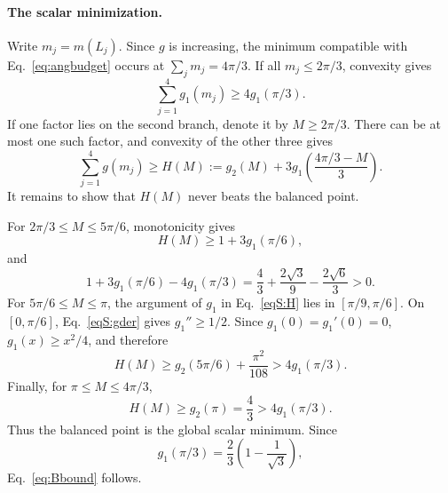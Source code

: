 \documentclass[aps,prl,reprint,superscriptaddress,nofootinbib]{revtex4-2}
\begin{document}
\paragraph{The scalar minimization.}
Write $m_j=m(L_j)$. Since $g$ is increasing, the minimum compatible with Eq.~\eqref{eq:angbudget} occurs at $\sum_jm_j=4\pi/3$. If all $m_j\leq2\pi/3$, convexity gives
\begin{equation}
\sum_{j=1}^{4}g_1(m_j)\geq4g_1(\pi/3).
\label{eqS:jensen}
\end{equation}
If one factor lies on the second branch, denote it by $M\geq2\pi/3$. There can be at most one such factor, and convexity of the other three gives
\begin{equation}
\sum_{j=1}^{4}g(m_j)\geq
H(M):=g_2(M)+3g_1\!\left(\frac{4\pi/3-M}{3}\right).
\label{eqS:H}
\end{equation}
It remains to show that $H(M)$ never beats the balanced point.

For $2\pi/3\leq M\leq5\pi/6$, monotonicity gives
\begin{equation}
H(M)\geq1+3g_1(\pi/6),
\end{equation}
and
\begin{equation}
1+3g_1(\pi/6)-4g_1(\pi/3)
=\frac43+\frac{2\sqrt3}{9}-\frac{2\sqrt6}{3}>0.
\label{eqS:r1}
\end{equation}
For $5\pi/6\leq M\leq\pi$, the argument of $g_1$ in Eq.~\eqref{eqS:H} lies in $[\pi/9,\pi/6]$. On $[0,\pi/6]$, Eq.~\eqref{eqS:gder} gives $g_1''\geq1/2$. Since $g_1(0)=g_1'(0)=0$, $g_1(x)\geq x^2/4$, and therefore
\begin{equation}
H(M)\geq g_2(5\pi/6)+\frac{\pi^2}{108}>4g_1(\pi/3).
\label{eqS:r2}
\end{equation}
Finally, for $\pi\leq M\leq4\pi/3$,
\begin{equation}
H(M)\geq g_2(\pi)=\frac43>4g_1(\pi/3).
\label{eqS:r3}
\end{equation}
Thus the balanced point is the global scalar minimum. Since
\begin{equation}
g_1(\pi/3)=\frac23\left(1-\frac1{\sqrt3}\right),
\end{equation}
Eq.~\eqref{eq:Bbound} follows.
\end{document}
